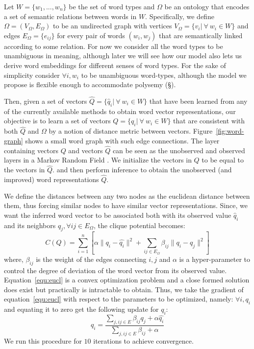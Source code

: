 \documentclass[11pt]{article}
\begin{document}
Let $W = \{w_1,...,w_n\}$ be the set of word types and $\Omega$ be an ontology that encodes a set of semantic relations between words in $W$. 
Specifically, we define $\Omega = (V_\Omega,E_\Omega)$ to be an undirected graph with vertices $V_\Omega = \{v_i | \  \forall \  w_i \in W\}$ and 
edges $E_\Omega = \{e_{ij}\}$ for every pair of words $(w_i,w_j)$ that are semantically linked according to some relation.
For now we consider all the word types to be unambiguous in meaning, although later we will see how 
our model also lets us derive word embeddings for different senses of 
word types. For the sake of simplicity consider $\forall i, w_i$ to be unambiguous word-types, 
although the model we propose is flexible enough to accommodate polysemy (\S).

Then, given a set of vectors $\hat{Q} = \{\hat{q}_i | \  \forall \  w_i \in W\}$ that have been learned from any of the currently available
methods to obtain word vector representations, our objective is to learn a set of vectors $Q = \{q_i | \  \forall \  w_i \in W\}$ that are 
consistent with both $\hat{Q}$ and $\Omega$ by a notion of distance metric between vectors. Figure~\ref{fig:word-graph} shows a small word graph with such edge 
connections. The layer containing vectors $Q$ and vectors $\hat{Q}$ can be seen as the unobserved and observed layers in a Markov Random Field 
\cite{kindermann80mrf}. We initialize the vectors in $Q$ to be equal to the vectors in $\hat{Q}$.
and then perform inference to obtain the unobserved (and improved) word representations $\hat{Q}$.

We define the distances between any two nodes as the euclidean distance between them, thus forcing 
similar nodes to have similar vector representations. Since, we want the inferred word vector to be
associated both with its observed value $\hat{q}_i$ and its neighbors 
$q_j, \forall ij \in E_{\Omega}$, the clique potential becomes:
\begin{equation}
  \label{equ:eucl}
  \displaystyle C(Q) = \sum_{i=1}^n \left[ \alpha \lVert q_i - \hat{q_i} \rVert^2 + \sum_{ij \in E_{\Omega}} \beta_{ij} \lVert q_i - q_j \rVert^2 \right]
\end{equation}
where, $\beta_{ij}$ is the weight of the edges connecting $i,j$ and $\alpha$ is a hyper-parameter to control the degree of deviation of the word 
vector from its observed value. Equation~\ref{equ:eucl} is a convex optimization problem and a close formed solution does exist but practically is intractable to obtain. Thus, we take the gradient of equation~\ref{equ:eucl} with respect to the parameters to be optimized, namely: $\forall i, q_i$ and equating it to zero get the following update for $q_i$:
\begin{equation}
  \label{equ:update-vector}
q_i = \frac{\sum_{j, ij \in E} \beta_{ij} q_j + \alpha \hat{q_i}}{\sum_{j, ij \in E} \beta_{ij} + \alpha}
\end{equation}
We run this procedure for $10$ iterations to achieve convergence.
\end{document}
